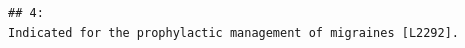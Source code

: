\documentclass[
]{book}
\begin{document}
\begin{verbatim}
## 4:                                                                                                                                                                                                                                                                                                                                                                                                                                                                                                                                                                                                                                                                                                                                                                                                                                                                                                                                                                                                                                                                                                                                                                                                                                                                                                                                                                                                                                                                                                                                                                                                                                                                                                                                                             Indicated for the prophylactic management of migraines [L2292].

\end{verbatim}
\end{document}
